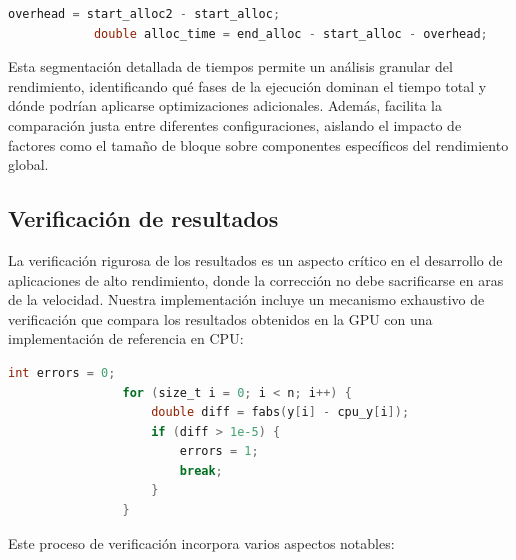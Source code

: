         \begin{lstlisting}[language=C, caption={Calculo del \textit{overhead} y reducción del total de tiempo.}, gobble=12]
            overhead = start_alloc2 - start_alloc;
            double alloc_time = end_alloc - start_alloc - overhead;
        \end{lstlisting}
        
        Esta segmentación detallada de tiempos permite un análisis granular del rendimiento, identificando qué fases de la ejecución dominan el tiempo total y dónde podrían aplicarse optimizaciones adicionales. Además, facilita la comparación justa entre diferentes configuraciones, aislando el impacto de factores como el tamaño de bloque sobre componentes específicos del rendimiento global.
        
        \subsection{Verificación de resultados}

            La verificación rigurosa de los resultados es un aspecto crítico en el desarrollo de aplicaciones de alto rendimiento, donde la corrección no debe sacrificarse en aras de la velocidad. Nuestra implementación incluye un mecanismo exhaustivo de verificación que compara los resultados obtenidos en la GPU con una implementación de referencia en CPU:

            \begin{lstlisting}[language=C, caption={Código de comprobación de errores.}, gobble=16]
                int errors = 0;
                for (size_t i = 0; i < n; i++) {
                    double diff = fabs(y[i] - cpu_y[i]);
                    if (diff > 1e-5) {
                        errors = 1;
                        break;
                    }
                }
            \end{lstlisting}

            Este proceso de verificación incorpora varios aspectos notables:
            
